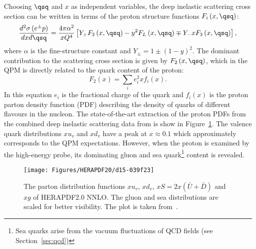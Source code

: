 Choosing $\qsq$ and $x$ as independent variables, the deep inelastic scattering cross section can be written in terms of the proton structure functions $F_i\left(x,\qsq\right)$:
\begin{equation}
\frac{d^2\sigma\left( e^\pm p \right) }{dxd\qsq} = \frac{4\pi\alpha^2}{xQ^4}\left[ Y_+F_2\left(x,\qsq\right) - y^2F_L\left(x,\qsq\right) \mp Y_-xF_3\left(x,\qsq\right) \right],
\label{eq:ddifDIS}
\end{equation}
where $\alpha$ is the fine-structure constant and $Y_\pm = 1 \pm \left( 1 - y \right)^2$. The dominant contribution to the scattering cross section is given by $F_2\left(x,\qsq\right)$, which in the QPM is directly related to the quark content of the proton:
\begin{equation}
F_2\left(x\right) = \sum_i{e_i^2xf_i\left(x\right)}.
\label{eq:f2pdf}
\end{equation}
In this equation $e_i$ is the fractional charge of the quark and $f_i\left(x\right)$ is the proton parton density function (PDF) describing the density of quarks of different flavours in the nucleon. The state-of-the-art extraction of the proton PDFs from the combined deep inelastic scattering data from \hera is show in Figure~\ref{fig:d15-039f23}. The valence quark distributions $xu_v$ and $xd_v$ have a peak at $x\approx 0.1$ which approximately corresponds to the QPM expectations. However, when the proton is examined by the high-energy probe, its dominating gluon and sea quark\footnote{Sea quarks arise from the vacuum fluctuations of QCD fields (see Section~\ref{sec:qcd})} content is revealed.
\begin{figure}[t!]
	\centering
		\texttt{[image: Figures/HERAPDF20/d15-039f23]}
	\caption{The parton distribution functions $xu_v$, $xd_v$, $xS=2x\left(\bar{U}+\bar{D}\right)$ and $xg$ of HERAPDF2.0 NNLO. The gluon and sea distributions are scaled for better visibility. The plot is taken from~\protect\cite{Abramowicz:2015mha}.}
	\label{fig:d15-039f23}
\end{figure}

